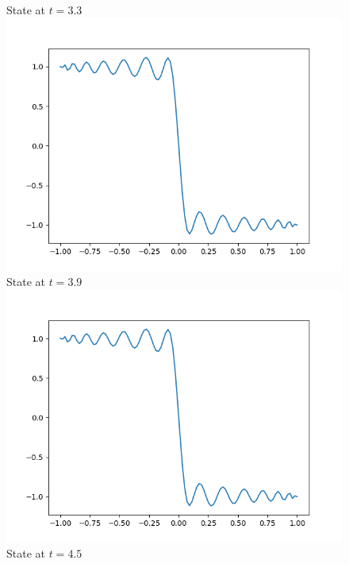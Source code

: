 \documentclass[a4paper,8pt]{article}
\begin{document}
\begin{figure}[h!]
\begin{multicols}{2}
State at $t=3.3$
\includegraphics[width=1\linewidth]{t3.9_plot.png}\\
State at $t=3.9$
\includegraphics[width=1\linewidth]{t4.5_plot.png}\\
State at $t=4.5$
\end{multicols}
\end{figure}
\end{document}

